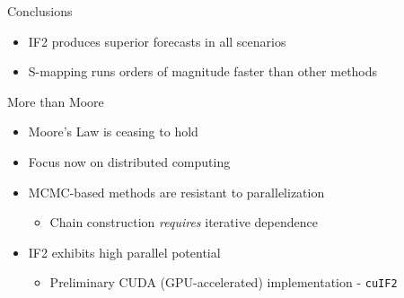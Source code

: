 \documentclass[12pt]{beamer}
\begin{document}
\begin{frame}

	Conclusions
	\vspace{\baselineskip}

	\begin{itemize}
		\item IF2 produces superior forecasts in all scenarios
		\item S-mapping runs orders of magnitude faster than other methods
	\end{itemize}

\end{frame}

\begin{frame}

	More than Moore
	\vspace{\baselineskip}

	\begin{itemize}
		\item Moore's Law is ceasing to hold
		\item Focus now on distributed computing
		\item MCMC-based methods are resistant to parallelization
		\begin{itemize}
		 	\item Chain construction \textit{requires} iterative dependence
		\end{itemize} 
		\item IF2 exhibits high parallel potential
		\begin{itemize}
			\item Preliminary CUDA (GPU-accelerated) implementation - \texttt{cuIF2}
		\end{itemize}
	\end{itemize}

\end{frame}
\end{document}
